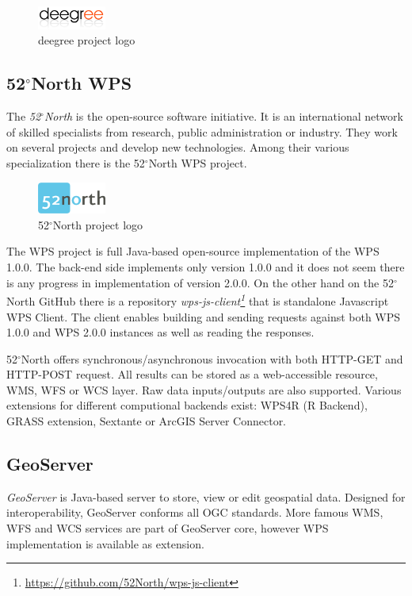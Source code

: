 \documentclass[12pt,a4paper]{article}
\begin{document}
\begin{figure}[h!]
\centering
\includegraphics[width=0.2\textwidth]{img/deegree.png}
\caption{deegree project logo}
\label{fig:deegree}
\end{figure}


\subsection{52$^{\circ}$North WPS}
The \textit{52$^{\circ}$North} is the open-source software initiative. It is an international network of skilled specialists from research,
public administration or industry. They work on several projects and develop new technologies. Among their various specialization there is 
the 52$^{\circ}$North WPS project.

\begin{figure}[h!]
\centering
\includegraphics[width=0.2\textwidth]{img/Intro_52north.png}
\caption{52$^{\circ}$North project logo}
\label{fig:Intro_52north}
\end{figure}

The  WPS project is full Java-based open-source implementation of the WPS 1.0.0. The back-end side implements only version 1.0.0 and it
does not seem there is any progress in implementation of version 2.0.0. On the other hand on the 52$^{\circ}$North GitHub there is a
repository \textit{wps-js-client\footnote{\url{https://github.com/52North/wps-js-client}}} that is standalone Javascript WPS Client. 
The client enables building and sending requests against both WPS 1.0.0 and WPS 2.0.0 instances as well as reading the responses.

52$^{\circ}$North offers synchronous/asynchronous invocation with both HTTP-GET and HTTP-POST request. All results can be stored as
a web-accessible resource, WMS, WFS or WCS layer. Raw data inputs/outputs are also supported. Various extensions for different
computional backends exist: WPS4R (R Backend), GRASS extension, Sextante or ArcGIS Server Connector.

\subsection{GeoServer}
\textit{GeoServer} is Java-based server to store, view or edit geospatial data. Designed for interoperability, GeoServer conforms
all OGC standards. More famous WMS, WFS and WCS services are part of GeoServer core, however WPS implementation is available as 
extension.
\end{document}
